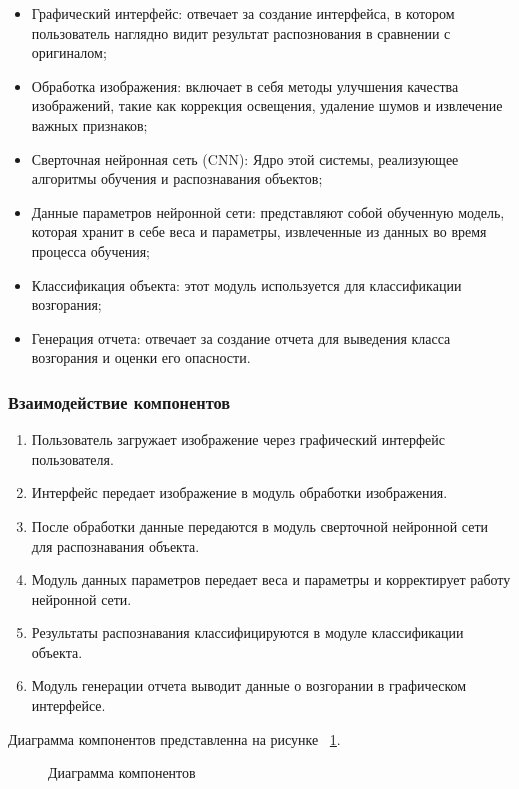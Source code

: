 \begin{itemize}
\item Графический интерфейс: отвечает за создание интерфейса, в котором пользователь наглядно видит результат распознования в сравнении с оригиналом;
\item Обработка изображения: включает в себя методы улучшения качества изображений, такие как коррекция освещения, удаление шумов и извлечение важных признаков;
\item Сверточная нейронная сеть (CNN): Ядро этой системы, реализующее алгоритмы обучения и распознавания объектов;
\item Данные параметров нейронной сети: представляют собой обученную модель, которая хранит в себе веса и параметры, извлеченные из данных во время процесса обучения;
\item Классификация объекта: этот модуль используется для классификации возгорания;
\item Генерация отчета: отвечает за создание отчета для выведения класса возгорания и оценки его опасности.
\end{itemize}

\subsubsection{Взаимодействие компонентов}

\begin{enumerate}
\item Пользователь загружает изображение через графический интерфейс пользователя.
\item Интерфейс передает изображение в модуль обработки изображения.
\item После обработки данные передаются в модуль сверточной нейронной сети для распознавания объекта.
\item Модуль данных параметров передает веса и параметры и корректирует работу нейронной сети.
\item Результаты распознавания классифицируются в модуле классификации объекта.
\item Модуль генерации отчета выводит данные о возгорании в графическом интерфейсе.
\end{enumerate}

Диаграмма компонентов представленна на рисунке ~\ref{comp:image}.

\begin{figure}[ht]
\caption{Диаграмма компонентов}
\label{comp:image}
\end{figure}

